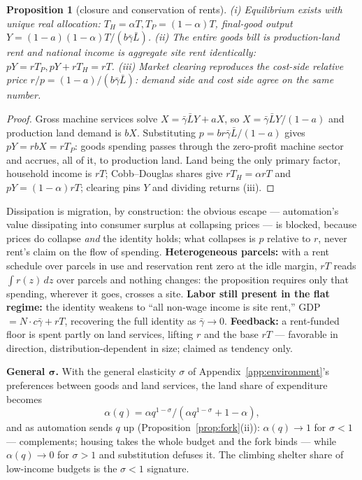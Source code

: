 \documentclass[12pt]{article}
\theoremstyle{plain}
\newtheorem{proposition}{Proposition}
\begin{document}
\begin{proposition}[closure and conservation of rents]\label{prop:landonly}
(i) Equilibrium exists with unique real allocation: $T_H = \alpha T, T_P = (1-\alpha )T$, final-good output $Y = (1-a)(1-\alpha )T/(b\bar{\gamma}\bar{L})$. (ii) The entire goods bill is production-land rent and national income is aggregate site rent identically: $pY = rT_P, pY + rT_H = rT$. (iii) Market clearing reproduces the cost-side relative price $r/p = (1-a)/(b\bar{\gamma}\bar{L})$: demand side and cost side agree on the same number.
\end{proposition}

\begin{proof}
Gross machine services solve $X = \bar{\gamma}\bar{L}Y + aX$, so $X = \bar{\gamma}\bar{L}Y/(1-a)$ and production land demand is $bX$. Substituting $p = br\bar{\gamma}\bar{L}/(1-a)$ gives $pY = r bX = rT_P$: goods spending passes through the zero-profit machine sector and accrues, all of it, to production land. Land being the only primary factor, household income is $rT$; Cobb--Douglas shares give $rT_H = \alpha rT$ and $pY = (1-\alpha )rT$; clearing pins $Y$ and dividing returns (iii).
\end{proof}

Dissipation is migration, by construction: the obvious escape --- automation's value dissipating into consumer surplus at collapsing prices --- is blocked, because prices do collapse \emph{and} the identity holds; what collapses is $p$ relative to $r$, never rent's claim on the flow of spending. \textbf{Heterogeneous parcels:} with a rent schedule over parcels in use and reservation rent zero at the idle margin, $rT$ reads $\int r(z)\,dz$ over parcels and nothing changes: the proposition requires only that spending, wherever it goes, crosses a site. \textbf{Labor still present in the flat regime:} the identity weakens to ``all non-wage income is site rent,'' GDP $= N\cdot c\bar{\gamma} + rT$, recovering the full identity as $\bar{\gamma} \to 0$. \textbf{Feedback:} a rent-funded floor is spent partly on land services, lifting $r$ and the base $rT$ --- favorable in direction, distribution-dependent in size; claimed as tendency only.

\textbf{General $\bm{\sigma}$.} With the general elasticity $\sigma$ of Appendix~\ref{app:environment}'s preferences between goods and land services, the land share of expenditure becomes
\begin{equation}\label{eq:ces-share}
\alpha (q) = \alpha q^{1-\sigma} / (\alpha q^{1-\sigma} + 1 - \alpha ),
\end{equation}
and as automation sends $q$ up (Proposition~\ref{prop:fork}(ii)): $\alpha (q) \to 1$ for $\sigma < 1$ --- complements; housing takes the whole budget and the fork binds --- while $\alpha (q) \to 0$ for $\sigma > 1$ and substitution defuses it. The climbing shelter share of low-income budgets is the $\sigma < 1$ signature.
\end{document}
